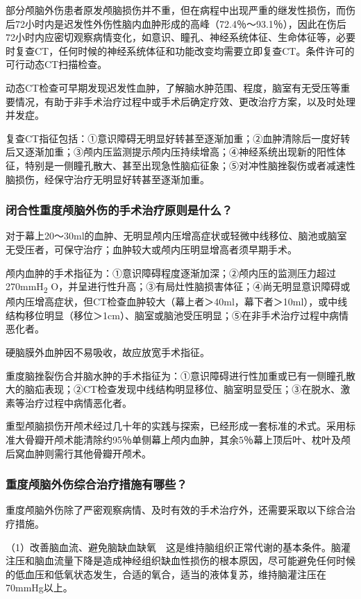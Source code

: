 部分颅脑外伤患者原发颅脑损伤并不重，但在病程中出现严重的继发性损伤，而伤后72小时内是迟发性外伤性脑内血肿形成的高峰（72.4％～93.1％），因此在伤后72小时内应密切观察病情变化，如意识、瞳孔、神经系统体征、生命体征等，必要时复查CT，任何时候的神经系统体征和功能改变均需要立即复查CT。条件许可的可行动态CT扫描检查。

动态CT检查可早期发现迟发性血肿，了解脑水肿范围、程度，脑室有无受压等重要情况，有助于非手术治疗过程中或手术后确定疗效、更改治疗方案，以及时处理并发症。

复查CT指征包括：①意识障碍无明显好转甚至逐渐加重；②血肿清除后一度好转后又逐渐加重；③颅内压监测提示颅内压持续增高；④神经系统出现新的阳性体征，特别是一侧瞳孔散大、甚至出现急性脑疝征象；⑤对冲性脑挫裂伤或者减速性脑损伤，经保守治疗无明显好转甚至逐渐加重。

\subsubsection{闭合性重度颅脑外伤的手术治疗原则是什么？}

对于幕上20～30ml的血肿、无明显颅内压增高症状或轻微中线移位、脑池或脑室无受压者，可保守治疗；血肿较大或颅内压明显增高者须早期手术。

颅内血肿的手术指征为：①意识障碍程度逐渐加深；②颅内压的监测压力超过270mmH\textsubscript{2}
O，并呈进行性升高；③有局灶性脑损害体征；④尚无明显意识障碍或颅内压增高症状，但CT检查血肿较大（幕上者＞40ml，幕下者＞10ml），或中线结构移位明显（移位＞1cm）、脑室或脑池受压明显；⑤在非手术治疗过程中病情恶化者。

硬脑膜外血肿因不易吸收，故应放宽手术指征。

重度脑挫裂伤合并脑水肿的手术指征为：①意识障碍进行性加重或已有一侧瞳孔散大的脑疝表现；②CT检查发现中线结构明显移位、脑室明显受压；③在脱水、激素等治疗过程中病情恶化者。

重型颅脑损伤开颅术经过几十年的实践与探索，已经形成一套标准的术式。采用标准大骨瓣开颅术能清除约95％单侧幕上颅内血肿，其余5％幕上顶后叶、枕叶及颅后窝血肿则需行其他骨瓣开颅术。

\subsubsection{重度颅脑外伤综合治疗措施有哪些？}

重度颅脑外伤除了严密观察病情、及时有效的手术治疗外，还需要采取以下综合治疗措施。

（1）改善脑血流、避免脑缺血缺氧　这是维持脑组织正常代谢的基本条件。脑灌注压和脑血流量下降是造成神经组织缺血性损伤的根本原因，尽可能避免任何时候的低血压和低氧状态发生，合适的氧合，适当的液体复苏，维持脑灌注压在70mmHg以上。

